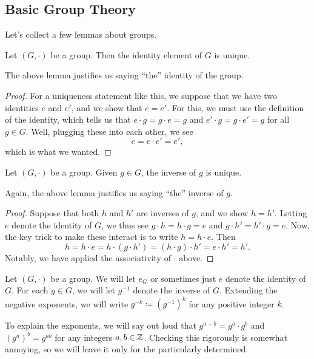 \documentclass[../main.tex]{subfiles}
\begin{document}
\subsection{Basic Group Theory}
Let's collect a few lemmas about groups.
\begin{lemma} \label{lem:id-is-uniq}
    Let $(G,\cdot)$ be a group. Then the identity element of $G$ is unique.
\end{lemma}
The above lemma justifies us saying ``the'' identity of the group.
\begin{proof}
    For a uniqueness statement like this, we suppose that we have two identities $e$ and $e'$, and we show that $e=e'$. For this, we must use the definition of the identity, which tells us that $e\cdot g=g\cdot e=g$ and $e'\cdot g=g\cdot e'=g$ for all $g\in G$. Well, plugging these into each other, we see
    \[e=e\cdot e'=e',\]
    which is what we wanted.
\end{proof}
\begin{lemma} \label{lem:inv-uniq}
    Let $(G,\cdot)$ be a group. Given $g\in G$, the inverse of $g$ is unique.
\end{lemma}
Again, the above lemma justifies us saying ``the'' inverse of $g$.
\begin{proof}
    Suppose that both $h$ and $h'$ are inverses of $g$, and we show $h=h'$. Letting $e$ denote the identity of $G$, we thus see $g\cdot h=h\cdot g=e$ and $g\cdot h'=h'\cdot g=e$. Now, the key trick to make these interact is to write $h=h\cdot e$. Then
    \[h=h\cdot e=h\cdot(g\cdot h')=(h\cdot g)\cdot h'=e\cdot h'=h'.\]
    Notably, we have applied the associativity of $\cdot$ above.
\end{proof}
\begin{notation}
    Let $(G,\cdot)$ be a group. We will let $e_G$ or sometimes just $e$ denote the identity of $G$. For each $g\in G$, we will let $g^{-1}$ denote the inverse of $G$. Extending the negative exponents, we will write $g^{-k}\coloneq\left(g^{-1}\right)^k$ for any positive integer $k$.
\end{notation}
To explain the exponents, we will say out loud that $g^{a+b}=g^a\cdot g^b$ and $\left(g^a\right)^b=g^{ab}$ for any integers $a,b\in\mathbb Z$. Checking this rigorously is somewhat annoying, so we will leave it only for the particularly determined.
\end{document}
